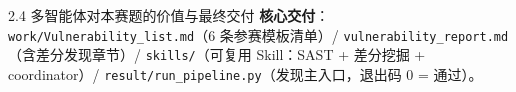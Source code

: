 \documentclass[11pt,aspectratio=169]{beamer}
\newcommand{\hlb}[1]{\textcolor{accentblue}{\textbf{#1}}}
\begin{document}
\begin{frame}{2.4 \quad 多智能体对本赛题的价值与最终交付}
  \vspace{0.08cm}
  {\scriptsize \hlb{核心交付}：\texttt{work/Vulnerability\_list.md}（6 条参赛模板清单）/ \texttt{vulnerability\_report.md}（含差分发现章节）/ \texttt{skills/}（可复用 Skill：SAST + 差分挖掘 + coordinator）/ \texttt{result/run\_pipeline.py}（发现主入口，退出码 0 = 通过）。}
\end{frame}
\end{document}
